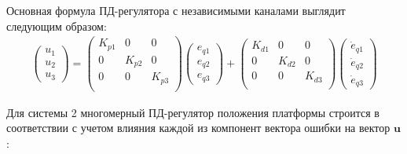 Основная формула ПД-регулятора с независимыми каналами выглядит следующим образом:
\begin{equation}
\label{eq:ControllerSystem1}
\begin{aligned}
	\begin{pmatrix}
	u_1 \\ u_2 \\ u_3
	\end{pmatrix} =
	\begin{pmatrix}
	K_{p1} & 0 & 0 \\
	0 & K_{p2} & 0 \\
	0 & 0 & K_{p3} \\
	\end{pmatrix}
	\begin{pmatrix}
	e_{q1} \\ e_{q2} \\ e_{q3}
	\end{pmatrix} +
	\begin{pmatrix}
	K_{d1} & 0 & 0 \\
	0 & K_{d2} & 0 \\
	0 & 0 & K_{d3} \\
	\end{pmatrix}
	\begin{pmatrix}
	\dot{e}_{q1} \\ \dot{e}_{q2} \\ \dot{e}_{q3}
	\end{pmatrix}
\end{aligned}
\end{equation}

Для системы 2 многомерный ПД-регулятор положения платформы \cite{Hernandez2009} строится в соответствии с учетом влияния каждой из компонент вектора ошибки на вектор $\mathbf{u}$:

